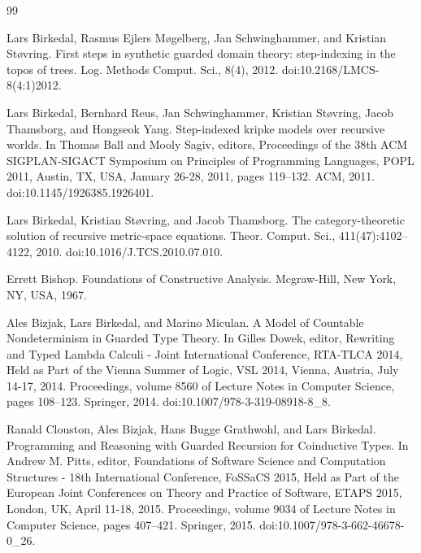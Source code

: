 \begin{thebibliography}{99}
\par\noindent    Lars Birkedal, Rasmus Ejlers Møgelberg, Jan Schwinghammer, and Kristian Støvring.  First steps in synthetic guarded domain theory: step-indexing in the topos of trees.  Log. Methods Comput. Sci., 8(4), 2012.  doi:10.2168/LMCS-8(4:1)2012.  

\par\noindent    Lars Birkedal, Bernhard Reus, Jan Schwinghammer, Kristian Støvring, Jacob Thamsborg, and Hongseok Yang.  Step-indexed kripke models over recursive worlds.  In Thomas Ball and Mooly Sagiv, editors, Proceedings of the 38th ACM SIGPLAN-SIGACT Symposium on Principles of Programming Languages, POPL 2011, Austin, TX, USA, January 26-28, 2011, pages 119–132. ACM, 2011.  doi:10.1145/1926385.1926401.  

\par\noindent    Lars Birkedal, Kristian Støvring, and Jacob Thamsborg.  The category-theoretic solution of recursive metric-space equations.  Theor. Comput. Sci., 411(47):4102–4122, 2010.  doi:10.1016/J.TCS.2010.07.010.  

\par\noindent    Errett Bishop.  Foundations of Constructive Analysis.  Mcgraw-Hill, New York, NY, USA, 1967.  

\par\noindent    Ales Bizjak, Lars Birkedal, and Marino Miculan.  A Model of Countable Nondeterminism in Guarded Type Theory.  In Gilles Dowek, editor, Rewriting and Typed Lambda Calculi - Joint International Conference, RTA-TLCA 2014, Held as Part of the Vienna Summer of Logic, VSL 2014, Vienna, Austria, July 14-17, 2014. Proceedings, volume 8560 of Lecture Notes in Computer Science, pages 108–123. Springer, 2014.  doi:10.1007/978-3-319-08918-8\_8.  

\par\noindent    Ranald Clouston, Ales Bizjak, Hans Bugge Grathwohl, and Lars Birkedal.  Programming and Reasoning with Guarded Recursion for Coinductive Types.  In Andrew M. Pitts, editor, Foundations of Software Science and Computation Structures - 18th International Conference, FoSSaCS 2015, Held as Part of the European Joint Conferences on Theory and Practice of Software, ETAPS 2015, London, UK, April 11-18, 2015. Proceedings, volume 9034 of Lecture Notes in Computer Science, pages 407–421. Springer, 2015.  doi:10.1007/978-3-662-46678-0\_26.  


\end{thebibliography}
